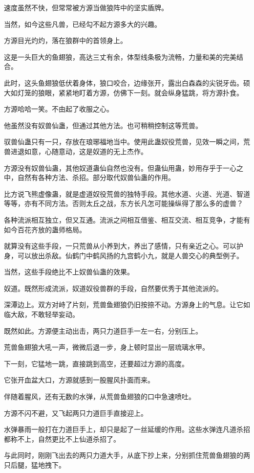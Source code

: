 \begin{this_body}
速度虽然不快，但常常被方源当做狼阵中的坚实盾牌。

当然，如今这些凡兽，已经勾不起方源多大的兴趣。

方源目光灼灼，落在狼群中的首领身上。

这是一头巨大的鱼翅狼，高达三丈有余，体型线条极为流畅，力量和美的完美结合。

此时，这头鱼翅狼低伏着身体，狼口咬合，边缘张开，露出白森森的尖锐牙齿。硕大如灯笼的狼眼，紧紧地盯着方源，仿佛下一刻。就会纵身猛跳，将方源扑食。

方源哈哈一笑。不由起了收服之心。

他虽然没有奴兽仙蛊，但通过其他方法。也可稍稍控制这等荒兽。

驭兽仙蛊只有一只，存放在琅琊福地当中。使用此蛊奴役荒兽，见效一瞬之间，荒兽进退如意，心随意动，这是奴道的无上杰作。

方源没有奴兽仙蛊，其他奴道蛊仙自然也没有。但蛊仙用蛊，妙用存乎于一心之中，自然有各种方法、杀招。部分取代奴兽仙蛊的作用。

比方说飞熊虚像蛊，就是虚道奴役荒兽的独特手段。其他水道、火道、光道、智道等等，亦有不同方法。否则太丘之战，东方长凡怎可能操纵得了那么多的虚兽？

各种流派相互独立，但又互通。流派之间相互借鉴、相互交流、相互竞争，才能有如今百花齐放的蛊师格局。

就算没有这些手段，一只荒兽从小养到大，养出了感情，只有亲近之心。可以护身，可以放出杀敌。仙鹤门中鹤风扬的九宫鹤小九，就是人兽交心的典型例子。

当然，这些手段绝比不上奴兽仙蛊的效果。

奴道。既然形成流派，奴道奴役兽群的手段，自然要优秀于其他流派的。

深潭边上。双方对峙了片刻，荒兽鱼翅狼仍旧按捺不动。方源身上的气息。让它如临大敌，不敢轻举妄动。

既然如此。方源便主动出击，两只力道巨手一左一右，分别压上。

荒兽鱼翅狼大吼一声，微微后退一步，身上顿时显出一层琉璃水甲。

下一刻，它猛地一跳，直接跳到高空，还要超过方源的高度。

它张开血盆大口，方源就感到一股腥风扑面而来。

伴随着腥风，还有无数的水弹，从荒兽鱼翅狼的口中急速喷吐。

方源不闪不避，又飞起两只力道巨手直接迎上。

水弹暴雨一般打在力道巨手上，却只是起了一丝延缓的作用。这些水弹连凡道杀招都称不上，自然更比不上仙道杀招了。

与此同时，刚刚飞出去的两只力道大手，从底下抄上来，分别抓住荒兽鱼翅狼的两只后腿，猛地拽下。


\end{this_body}
